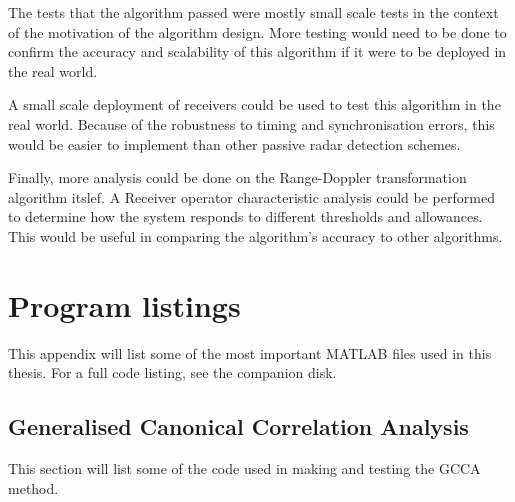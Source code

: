 \documentclass[12pt,openany,a4paper]{book}
\begin{document}
\bigskip

The tests that the algorithm passed were mostly small scale tests in the context of the motivation of the algorithm design. More testing would need to be done to confirm the accuracy and scalability of this algorithm if it were to be deployed in the real world.

\bigskip

A small scale deployment of receivers could be used to test this algorithm in the real world. Because of the robustness to timing and synchronisation errors, this would be easier to implement than other passive radar detection schemes. 

\bigskip

Finally, more analysis could be done on the Range-Doppler transformation algorithm itslef. A Receiver operator characteristic analysis could be performed to determine how the system responds to different thresholds and allowances. This would be useful in comparing the algorithm's accuracy to other algorithms.


\appendix


\newpage
{}
\mbox{}
\newpage



\chapter{Program listings}

This appendix will list some of the most important MATLAB files used in this thesis. For a full code listing, see the companion disk.

\section{Generalised Canonical Correlation Analysis}
This section will list some of the code used in making and testing the GCCA method.
\end{document}
